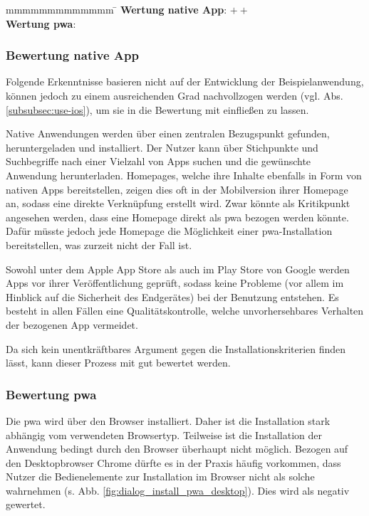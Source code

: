 \begin{tabbing}
	mmmmmmmmmmmmm				\= \kill
	\textbf{Wertung native App}: \> $++$ \\
	\textbf{Wertung \ac{pwa}}: \> \Circle
\end{tabbing}

\subsubsection{Bewertung native App}
Folgende Erkenntnisse basieren nicht auf der Entwicklung der Beispielanwendung, können jedoch zu einem ausreichenden Grad nachvollzogen werden (vgl. Abs. \ref{subsubsec:use-ios}), um sie in die Bewertung mit einfließen zu lassen.

 Native Anwendungen werden über einen zentralen Bezugspunkt gefunden, heruntergeladen und installiert. Der Nutzer kann über Stichpunkte und Suchbegriffe nach einer Vielzahl von Apps suchen und die gewünschte Anwendung herunterladen. Homepages, welche ihre Inhalte ebenfalls in Form von nativen Apps bereitstellen, zeigen dies oft in der Mobilversion ihrer Homepage an, sodass eine direkte Verknüpfung erstellt wird. Zwar könnte als Kritikpunkt angesehen werden, dass eine Homepage direkt als \ac{pwa} bezogen werden könnte. Dafür müsste jedoch jede Homepage die Möglichkeit einer \ac{pwa}-Installation bereitstellen, was zurzeit nicht der Fall ist.
 
 Sowohl unter dem Apple App Store als auch im Play Store von Google werden Apps vor ihrer Veröffentlichung geprüft, sodass keine Probleme (vor allem im Hinblick auf die Sicherheit des Endgerätes) bei der Benutzung entstehen. Es besteht in allen Fällen eine Qualitätskontrolle, welche unvorhersehbares Verhalten der bezogenen App vermeidet.
 
 Da sich kein unentkräftbares Argument gegen die Installationskriterien finden lässt, kann dieser Prozess mit gut bewertet werden.
 
\subsubsection{Bewertung \ac{pwa}}
Die \ac{pwa} wird über den Browser installiert. Daher ist die Installation stark abhängig vom verwendeten Browsertyp. Teilweise ist die Installation der Anwendung bedingt durch den Browser überhaupt nicht möglich. Bezogen auf den Desktopbrowser Chrome dürfte es in der Praxis häufig vorkommen, dass Nutzer die Bedienelemente zur Installation im Browser nicht als solche wahrnehmen (s. Abb. \ref{fig:dialog_install_pwa_desktop}). Dies wird als negativ gewertet.

